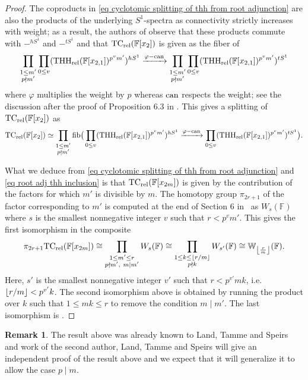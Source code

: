 \documentclass[english,10pt]{amsart}
\newcommand{\rel}{\textup{rel}}
\newcommand{\field}{\mathbb{F}}
\theoremstyle{definition}
\newtheorem{rema}{Remark}[section]
\numberwithin{equation}{section}
\newcommand{\rtc}{\mathrm{TC}_{\rel}}
\newcommand{\rthh}{\mathrm{THH}_{\rel}}
\DeclareMathOperator{\can}{\ensuremath{\textup{can}}}
\DeclarePairedDelimiter\floor{\lfloor}{\rfloor}
\begin{document}
\begin{proof}
      The coproducts in \eqref{eq cyclotomic splitting of thh from root adjunction}  are also the products of the underlying $S^1$-spectra as connectivity strictly increases with weight; as a result, the authors of \cite{bayindir2020kthryofthh} observe that these products commute with $-^{hS^1}$ and $-^{tS^1}$ and  that $\rtc(\field[x_{2}])$ is given as the fiber of 
      \[\prod_{\substack{1 \leq m'\\ p \nmid m'}} \prod_{0 \leq v} (\rthh(\field[x_{2,1}])^{p^vm'})^{hS^1} \xrightarrow{\varphi - \can} \prod_{\substack{1 \leq m'\\ p \nmid m'}} \prod_{0 \leq v} (\rthh(\field[x_{2,1}])^{p^vm'})^{tS^1}\]
      where $\varphi$  multiplies the weight by $p$ whereas $\can$ respects the weight; see the discussion after the proof of Proposition 6.3 in \cite{bayindir2020kthryofthh}. This gives a splitting of $\rtc(\field[x_{2}])$ as 
      \[\rtc(\field[x_{2}]) \simeq \prod_{\substack{1 \leq m'\\ p \nmid m'}} \textup{fib}\big(  \prod_{0 \leq v} (\rthh(\field[x_{2,1}])^{p^vm'})^{hS^1} \xrightarrow{\varphi - \can}  \prod_{0 \leq v} (\rthh(\field[x_{2,1}])^{p^vm'})^{tS^1}\big).\]
  
        What we deduce from   \eqref{eq cyclotomic splitting of thh from root adjunction} and \eqref{eq root adj thh inclusion} is that $\rtc(\field[x_{2m}])$ is given by the contribution of the factors for which $m'$ is divisible by $m$. The homotopy group $\pi_{2r+1}$ of the factor corresponding to $m'$ is computed at the end of Section 6 in~\cite{bayindir2020kthryofthh} as $W_s(\field)$ where $s$  is the smallest nonnegative integer $v$ such that $r<p^vm'$. This gives the first isomorphism in the composite 
       \[\pi_{2r+1}\rtc(\field[x_{2m}])\cong \prod_{\substack{1 \leq m' \leq r \\ p\nmid m',\  m \mid m'}} W_s(\field)\cong  \prod_{\substack{1 \leq k \leq \floor*{r/m} \\ p\nmid k}} W_{s'}(\field) \cong \mathbb{W}_{\floor*{\frac{r}{m}}}(\field).\]
    Here, $s'$ is the smallest nonnegative integer $v'$ such that $r<p^{v'}mk$, i.e.\ $\floor*{r/m}<p^{v'}k$. The second isomorphism above is obtained by running the product over $k$ such that $1\leq mk\leq r$ to remove the condition $m \mid m'$. The last isomorphism is \cite[Example 1.11]{hesselholt2015bigderhamwitt}.    
\end{proof}

\begin{rema}
The result above was already known to Land, Tamme and Speirs and work of the second author, Land, Tamme and Speirs will give an independent proof of the result above and we expect that it will generalize it to allow the case $p\mid m$. 
\end{rema}
\end{document}
